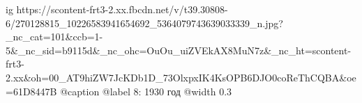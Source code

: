  
 
 
 
 

\ifcmt
  ig https://scontent-frt3-2.xx.fbcdn.net/v/t39.30808-6/270128815_10226583941654692_5364079743639033339_n.jpg?_nc_cat=101&ccb=1-5&_nc_sid=b9115d&_nc_ohc=OuOu_uiZVEkAX8MuN7z&_nc_ht=scontent-frt3-2.xx&oh=00_AT9hiZW7JcKDb1D_73OlxpxIK4KsOPB6DJO0coReThCQBA&oe=61D8447B
	@caption @label 8: 1930 год
  @width 0.3
\fi

